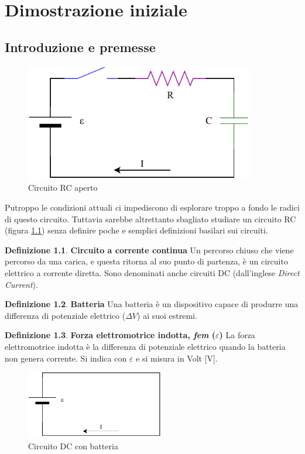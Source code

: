 \documentclass[a3paper, twoside, openany]{book}
\theoremstyle{definition}
\newtheorem{definition}{Definizione}
\begin{document}
\chapter{Dimostrazione iniziale}
\section{Introduzione e premesse}
\begin{figure}[htp]
    \centering
    \includegraphics[width=10cm]{Circuito RC-Aperto}
    \caption{Circuito RC aperto}
    \label{fig:RC-aperto}
\end{figure}
Putroppo le condizioni attuali ci impediscono di esplorare troppo a fondo le radici di questo circuito. Tuttavia sarebbe altrettanto sbagliato studiare un circuito RC (figura \ref{fig:RC-aperto}) senza definire poche e semplici definizioni basilari sui circuiti.
\theoremstyle{definition}
\begin{definition}{\textbf{Circuito a corrente continua}}
Un percorso chiuso che viene percorso da una carica, e questa ritorna al suo punto di partenza, è un circuito elettrico a corrente diretta. Sono denominati anche circuiti DC (dall'inglese \emph{Direct Current}).
\end{definition}
\begin{definition}{\textbf{Batteria}}
Una batteria è un dispositivo capace di produrre una differenza di potenziale elettrico ($\Delta V$) ai suoi estremi.
\end{definition}
\begin{definition}{\textbf{Forza elettromotrice indotta, \emph{fem} ($\varepsilon$)}}
La forza elettromotrice indotta è la differenza di potenziale elettrico quando la batteria non genera corrente. Si indica con $\varepsilon$ e si misura in Volt [V].
\end{definition}
\begin{figure}[htp]
    \centering
    \includegraphics[width=6cm]{Circuito RC-Batteria}
    \caption{Circuito DC con batteria}
    \label{fig:batteria}
\end{figure}
\end{document}
